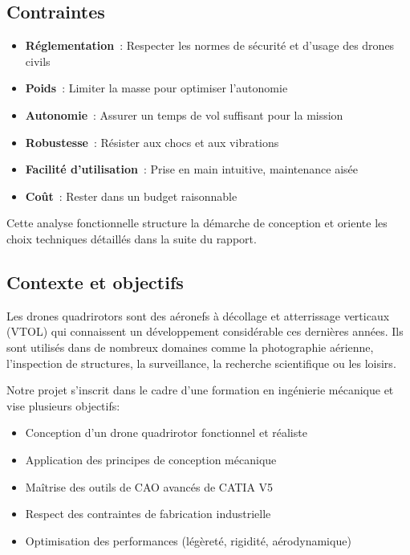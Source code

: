 \documentclass[a4paper,12pt]{report}
\begin{document}
\subsection{Contraintes}
\begin{itemize}
    \item \textbf{Réglementation} : Respecter les normes de sécurité et d'usage des drones civils
    \item \textbf{Poids} : Limiter la masse pour optimiser l'autonomie
    \item \textbf{Autonomie} : Assurer un temps de vol suffisant pour la mission
    \item \textbf{Robustesse} : Résister aux chocs et aux vibrations
    \item \textbf{Facilité d'utilisation} : Prise en main intuitive, maintenance aisée
    \item \textbf{Coût} : Rester dans un budget raisonnable
\end{itemize}

Cette analyse fonctionnelle structure la démarche de conception et oriente les choix techniques détaillés dans la suite du rapport.

\subsection{Contexte et objectifs}
Les drones quadrirotors sont des aéronefs à décollage et atterrissage verticaux (VTOL) qui connaissent un développement considérable ces dernières années. Ils sont utilisés dans de nombreux domaines comme la photographie aérienne, l'inspection de structures, la surveillance, la recherche scientifique ou les loisirs.

Notre projet s'inscrit dans le cadre d'une formation en ingénierie mécanique et vise plusieurs objectifs:
\begin{itemize}
    \item Conception d'un drone quadrirotor fonctionnel et réaliste
    \item Application des principes de conception mécanique
    \item Maîtrise des outils de CAO avancés de CATIA V5
    \item Respect des contraintes de fabrication industrielle
    \item Optimisation des performances (légèreté, rigidité, aérodynamique)
\end{itemize}
\end{document}
